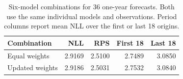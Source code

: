 \begin{table}[htbp]
\centering\small
\caption{Six-model combinations for 36 one-year forecasts. Both use the same individual models and observations. Period columns report mean NLL over the first or last 18 origins.}
\label{tab:combinations}
\begin{tabular}{lrrrr}
\toprule
Combination & NLL & RPS & First 18 & Last 18 \\
\midrule
Equal weights & 2.9169 & 2.5100 & 2.7489 & 3.0850 \\
Updated weights & 2.9186 & 2.5031 & 2.7532 & 3.0840 \\
\bottomrule
\end{tabular}
\end{table}
